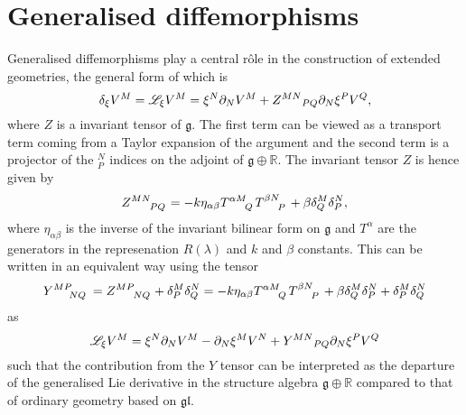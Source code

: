 \section{Generalised diffemorphisms}
Generalised diffemorphisms play a central rôle in the construction of extended geometries, the general form of which is
\begin{equation}
    \delta_\xi V^M = \mathscr{L}_\xi V^M = \xi^N\pd_N V^M+\tensor{Z}{^M^N}_{PQ}\pd_N\xi^PV^Q,
\end{equation}
where $Z$ is a invariant tensor of $\mathfrak{g}$. The first term can be viewed as a transport term coming from a Taylor expansion of the argument and the second term is a projector of the $^N_P$ indices on the adjoint of $\mathfrak{g}\oplus \mathbb{R}$. The invariant tensor $Z$ is hence given by 
\begin{equation}
    \tensor{Z}{^M^N_P_Q} = -k\eta_{\alpha\beta}\tensor{T}{^\alpha^M_Q}\tensor{T}{^\beta^N_P}+\beta\delta^M_Q\delta^N_P,
\end{equation}
where $\eta_{\alpha\beta}$ is the inverse of the invariant bilinear form on $\mathfrak{g}$ and $T^{\alpha}$ are the generators in the represenation $R(\lambda)$ and $k$ and $\beta$ constants. This can be written in an equivalent way using the tensor
\begin{equation}\label{eq:Y}
    \tensor{Y}{^M^P_N_Q} = \tensor{Z}{^M^P_N_Q}+\delta^M_P\delta^N_Q = -k\eta_{\alpha\beta}\tensor{T}{^\alpha^M_Q}\tensor{T}{^\beta^N_P}+\beta\delta^M_Q\delta^N_P+\delta^M_P\delta^N_Q
\end{equation}
as 
\begin{equation}
    \mathscr{L}_\xi V^M = \xi^N\pd_N V^M-\pd_N\xi^MV^N+\tensor{Y}{^M^N}_{PQ}\pd_N\xi^PV^Q
\end{equation}
such that the contribution from the $Y$ tensor can be interpreted as the departure of the generalised Lie derivative in the structure algebra $\mathfrak{g}\oplus\mathbb{R}$ compared to that of ordinary geometry based on $\mathfrak{gl}$. 

